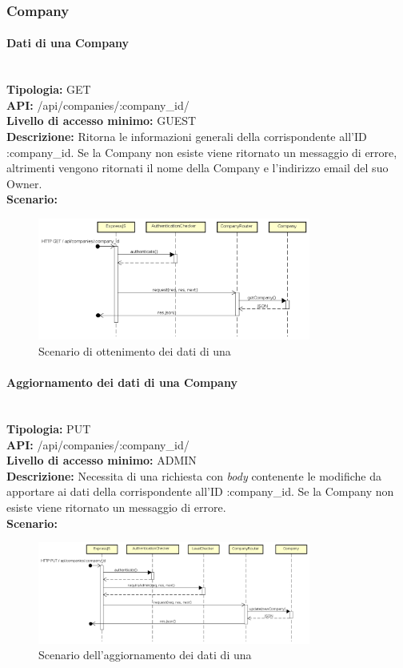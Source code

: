 \newpage
\subsubsection{Company}
\paragraph{Dati di una Company}\mbox{}\\
\textbf{Tipologia:} GET \\
\textbf{API:} /api/companies/:company\_id/ \\
\textbf{Livello di accesso minimo:} GUEST \\
\textbf{Descrizione:} Ritorna le informazioni generali della  corrispondente all'ID :company\_id. Se la Company non esiste viene ritornato un messaggio di errore, altrimenti vengono ritornati il nome della Company e l'indirizzo email del suo Owner. \\
\textbf{Scenario:} 
\begin{figure}[H]
\centering
\includegraphics[width=0.8\textwidth]{res/sections/backend/sequence/(GET)company.png}
\caption{Scenario di ottenimento dei dati di una }
\end{figure}

\newpage
\paragraph{Aggiornamento dei dati di una Company}\mbox{}\\
\textbf{Tipologia:} PUT \\
\textbf{API:} /api/companies/:company\_id/ \\
\textbf{Livello di accesso minimo:} ADMIN \\
\textbf{Descrizione:} Necessita di una richiesta con \textit{body} contenente le modifiche da apportare ai dati della  corrispondente all'ID :company\_id. Se la Company non esiste viene ritornato un messaggio di errore. \\
\textbf{Scenario:} 
\begin{figure}[H]
\centering
\includegraphics[width=0.8\textwidth]{res/sections/backend/sequence/(PUT)company.png}
\caption{Scenario dell'aggiornamento dei dati di una }
\end{figure}

